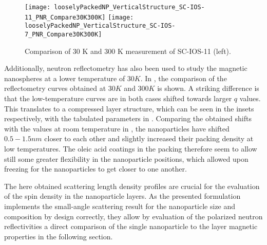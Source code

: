 \documentclass[\main/dresen_thesis.tex]{subfiles}
\begin{document}
  \begin{figure}[tb]
    \centering
    \texttt{[image: looselyPackedNP\_VerticalStructure\_SC-IOS-11\_PNR\_Compare30K300K]}
    \texttt{[image: looselyPackedNP\_VerticalStructure\_SC-IOS-7\_PNR\_Compare30K300K]}
    \caption{\label{fig:looselyPackedNP:layer:pnrCompare30K300K}Comparison of 30 K and 300 K measurement of SC-IOS-11 (left).}
  \end{figure}
  Additionally, neutron reflectometry has also been used to study the magnetic nanospheres at a lower temperature of $30 \unit{K}$.
  In , the comparison of the reflectometry curves obtained at $30 \unit{K}$ and $300 \unit{K}$ is shown.
  A striking difference is that the low-temperature curves are in both cases shifted towards larger $q$ values.
  This translates to a compressed layer structure, which can be seen in the insets respectively, with the tabulated parameters in .
  Comparing the obtained shifts with the values at room temperature in , the nanoparticles have shifted $0.5 - 1.5 \unit{nm}$ closer to each other and slightly increased their packing density at low temperatures.
  The oleic acid coatings in the packing therefore seem to allow still some greater flexibility in the nanoparticle positions, which allowed upon freezing for the nanoparticles to get closer to one another.

  The here obtained scattering length density profiles are crucial for the evaluation of the spin density in the nanoparticle layers.
  As the presented formulation implements the small-angle scattering result for the nanoparticle size and composition by design correctly, they allow by evaluation of the polarized neutron reflectivities a direct comparison of the single nanoparticle to the layer magnetic properties in the following section.
\end{document}

